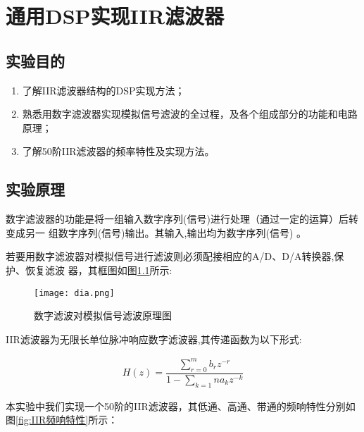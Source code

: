 \documentclass[../main]{subfiles}
\begin{document}
\chapter{通用DSP实现IIR滤波器}%
\label{cha:通用DSP实现IIR滤波器}

\section{实验目的}%
\label{sec:\arabic{chapter}实验目的}

\begin{enumerate}

	\item 了解IIR滤波器结构的DSP实现方法；

	\item 熟悉用数字滤波器实现模拟信号滤波的全过程，及各个组成部分的功能和电路原理；

	\item 了解50阶IIR滤波器的频率特性及实现方法。

\end{enumerate}

\section{实验原理}%
\label{sec:\arabic{chapter}实验原理}

数字滤波器的功能是将一组输入数字序列(信号)进行处理（通过一定的运算）后转变成另一
组数字序列(信号)输出。其输入,输出均为数字序列(信号) 。

若要用数字滤波器对模拟信号进行滤波则必须配接相应的A/D、D/A转换器,保护、恢复滤波
器，其框图如图\ref{fig:数字滤波对模拟信号滤波原理图}所示:

\begin{figure}[htbp]
	\centering
	\texttt{[image: dia.png]}
	\caption{数字滤波对模拟信号滤波原理图}
	\label{fig:数字滤波对模拟信号滤波原理图}
\end{figure}

IIR滤波器为无限长单位脉冲响应数字滤波器,其传递函数为以下形式:

\begin{align}
	H(z) = \dfrac{\sum\limits_{r = 0}^{m}b_rz^{-r}}
	{1 - \sum\limits_{k = 1}{n}a_kz^{ - k}}
\end{align}

本实验中我们实现一个50阶的IIR滤波器，其低通、高通、带通的频响特性分别如
图\ref{fig:IIR频响特性}所示：
\end{document}
